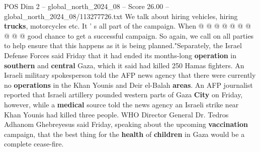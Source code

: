 \begin{textsample}{POS Dim 2 – global\_north\_2024\_08 – Score 26.00 – global\_north\_2024\_08/113277726.txt}
We talk about hiring vehicles, hiring \textbf{trucks}, motorcycles etc.
It ' s all part of the campaign.
When @ @ @ @ @ @ @ @ @ @ good chance to get a successful campaign.
So again, we call on all parties to help ensure that this happens as it is being planned."Separately, the Israel Defense Forces said Friday that it had ended its months-long \textbf{operation} in \textbf{southern} and \textbf{central} Gaza, which it said had killed 250 Hamas fighters.
An Israeli military spokesperson told the AFP news agency that there were currently no \textbf{operations} in the Khan Younis and Deir el-Balah \textbf{areas}.
An AFP journalist reported that Israeli artillery pounded western parts of Gaza \textbf{City} on Friday, however, while a \textbf{medical} source told the news agency an Israeli strike near Khan Younis had killed three people.
WHO Director General Dr.
Tedros Adhanom Ghebreyesus said Friday, speaking about the upcoming \textbf{vaccination} campaign, that the best thing for the \textbf{health} of \textbf{children} in Gaza would be a complete cease-fire.

\end{textsample}
